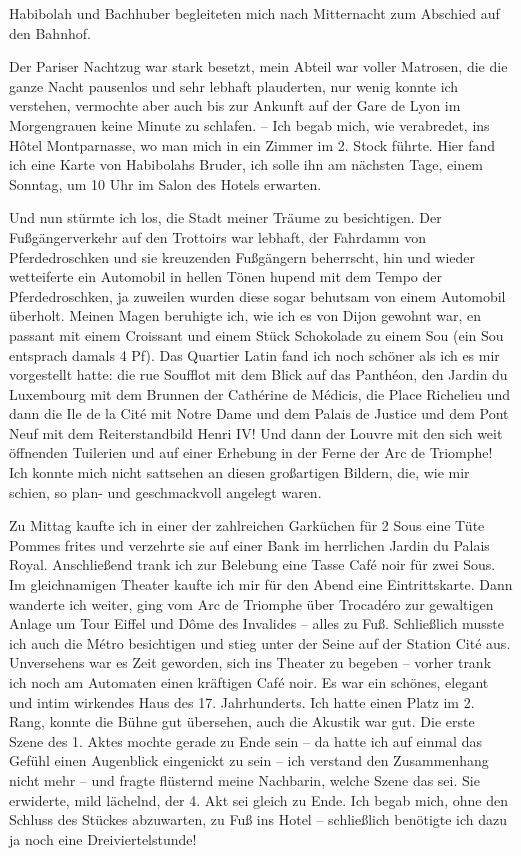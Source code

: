 Habibolah und Bachhuber begleiteten mich nach Mitternacht zum Abschied auf den Bahnhof.

Der Pariser Nachtzug war stark besetzt, mein Abteil war voller Matrosen, die die ganze Nacht pausenlos und sehr lebhaft plauderten, nur wenig konnte ich verstehen, vermochte aber auch bis zur Ankunft auf der Gare de Lyon im Morgengrauen keine Minute zu schlafen. -- Ich begab mich, wie verabredet, ins Hôtel Montparnasse, wo man mich in ein Zimmer im 2. Stock führte. Hier fand ich eine Karte von Habibolahs Bruder, ich solle ihn am nächsten Tage, einem Sonntag, um 10 Uhr im Salon des Hotels erwarten.

Und nun stürmte ich los, die Stadt meiner Träume zu besichtigen. Der Fußgängerverkehr auf den Trottoirs war lebhaft, der Fahrdamm von Pferdedroschken und sie kreuzenden Fußgängern beherrscht, hin und wieder wetteiferte ein Automobil in hellen Tönen hupend mit dem Tempo der Pferdedroschken, ja zuweilen wurden diese sogar behutsam von einem Automobil überholt. Meinen Magen beruhigte ich, wie ich es von Dijon gewohnt war, en passant mit einem Croissant und einem Stück Schokolade zu einem Sou (ein Sou entsprach damals 4 Pf). Das Quartier Latin fand ich noch schöner als ich es mir vorgestellt hatte: die rue Soufflot mit dem Blick auf das Panthéon, den Jardin du Luxembourg mit dem Brunnen der Cathérine de Médicis, die Place Richelieu und dann die Ile de la Cité mit Notre Dame und dem Palais de Justice und dem Pont Neuf mit dem Reiterstandbild Henri IV! Und dann der Louvre mit den sich weit öffnenden Tuilerien und auf einer Erhebung in der Ferne der Arc de Triomphe! Ich konnte mich nicht sattsehen an diesen großartigen Bildern, die, wie mir schien, so plan- und geschmackvoll angelegt waren.

Zu Mittag kaufte ich in einer der zahlreichen Garküchen für 2 Sous eine Tüte Pommes frites und verzehrte sie auf einer Bank im herrlichen Jardin du Palais Royal. Anschließend trank ich zur Belebung eine Tasse Café noir für zwei Sous. Im gleichnamigen Theater kaufte ich mir für den Abend eine Eintrittskarte. Dann wanderte ich weiter, ging vom Arc de Triomphe über Trocadéro zur gewaltigen Anlage um Tour Eiffel und Dôme des  Invalides -- alles zu Fuß. Schließlich musste ich auch die Métro besichtigen und stieg unter der Seine auf der Station Cité aus. Unversehens war es Zeit geworden, sich ins Theater zu begeben -- vorher trank ich noch am Automaten einen kräftigen Café noir. Es war ein schönes, elegant und intim wirkendes Haus des 17. Jahrhunderts. Ich hatte einen Platz im 2. Rang, konnte die Bühne gut übersehen, auch die Akustik war gut. Die erste Szene des 1. Aktes mochte gerade zu Ende sein -- da hatte ich auf einmal das Gefühl einen Augenblick eingenickt zu sein -- ich verstand den Zusammenhang nicht mehr -- und fragte flüsternd meine Nachbarin, welche Szene das sei. Sie erwiderte, mild lächelnd, der 4. Akt sei gleich zu Ende. Ich begab mich, ohne den Schluss des Stückes abzuwarten, zu Fuß ins Hotel -- schließlich benötigte ich dazu ja noch eine Dreiviertelstunde!

